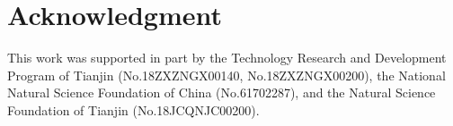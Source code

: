 \documentclass[conference]{IEEEtran}
\begin{document}
\section*{Acknowledgment}
This work was supported in part by the Technology Research and Development Program of Tianjin (No.18ZXZNGX00140, No.18ZXZNGX00200), the National Natural Science Foundation of China (No.61702287), and the Natural Science Foundation of Tianjin (No.18JCQNJC00200).



\end{document}

